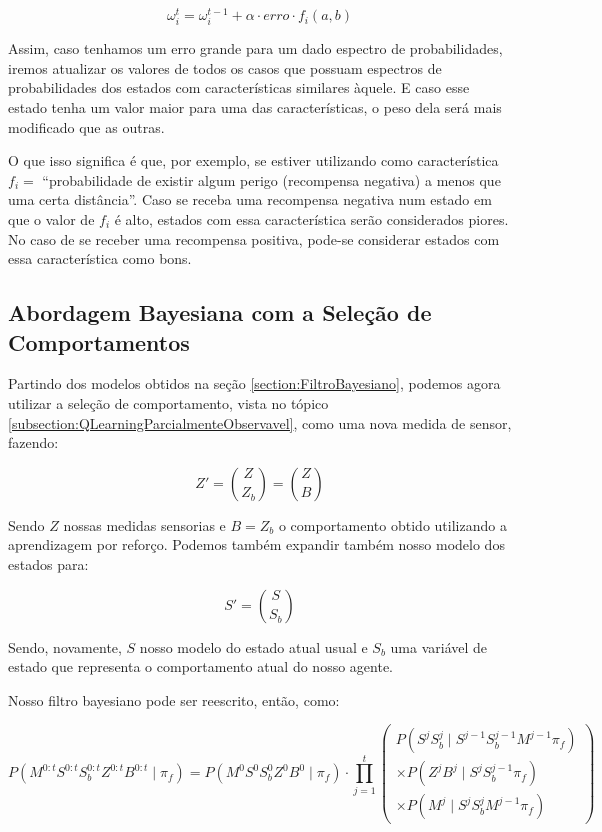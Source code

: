 \begin{equation}
	\omega_i^t = \omega_i^{t-1} + \alpha \cdot erro \cdot f_i \left( a, b \right)
\end{equation}

Assim, caso tenhamos um erro grande para um dado espectro de probabilidades, iremos atualizar os valores de todos os casos que possuam espectros de probabilidades dos estados com características similares àquele. E caso esse estado tenha um valor maior para uma das características, o peso dela será mais modificado que as outras.

O que isso significa é que, por exemplo, se estiver utilizando como característica $ f_i = $ ``probabilidade de existir algum perigo (recompensa negativa) a menos que uma certa distância''. Caso se receba uma recompensa negativa num estado em que o valor de $ f_i $ é alto, estados com essa característica serão considerados piores. No caso de se receber uma recompensa positiva, pode-se considerar estados com essa característica como bons.


\subsection{Abordagem Bayesiana com a Seleção de Comportamentos} \label{subsection:BayesComSelecaoDeComportamento}

Partindo dos modelos obtidos na seção \ref{section:FiltroBayesiano}, podemos agora utilizar a seleção de comportamento, vista no tópico \ref{subsection:QLearningParcialmenteObservavel}, como uma nova medida de sensor, fazendo:

\begin{equation}
	Z' = \binom{Z}{Z_b} = \binom{Z}{B}
\end{equation}

Sendo $ Z $ nossas medidas sensorias e $ B = Z_b $ o comportamento obtido utilizando a aprendizagem por reforço. Podemos também expandir também nosso modelo dos estados para:

\begin{equation}
	S' = \binom{S}{S_b}
\end{equation}

Sendo, novamente, $ S $ nosso modelo do estado atual usual e $ S_b $ uma variável de estado que representa o comportamento atual do nosso agente.

Nosso filtro bayesiano pode ser reescrito, então, como:

\begin{equation}
        P \left( M^{0: t} S^{0: t} S_b^{0: t} Z^{0: t} B^{0: t} \mid \pi_f \right) = P \left( M^0 S^0 S_b^0 Z^0 B^0 \mid \pi_f \right) \cdot \prod\limits_{j =1}^{t} 
        \left(
            \begin{array}{l}
                P \left( S^j S_b^j \mid S^{j -1} S_b^{j-1} M^{j -1} \pi_f \right) \\
                \times P \left( Z^j B^j \mid S^j S_b^{j-1} \pi_f \right) \\
                \times P \left( M^j \mid S^j S_b^j M^{j -1} \pi_f \right)
            \end{array}
        \right)
\end{equation}

